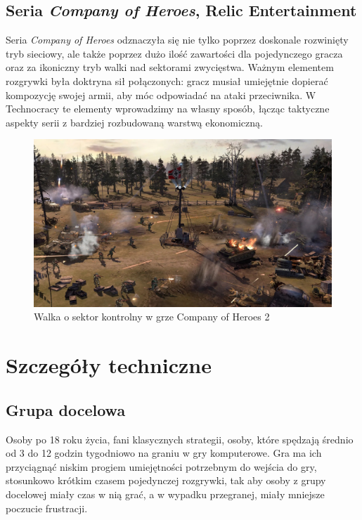 \documentclass[a4paper]{scrreprt}
\def \GameTiTle{Technocracy}
\begin{document}
\section{Seria \emph{Company of Heroes}, Relic Entertainment}
Seria \emph{Company of Heroes} odznaczyła się nie tylko poprzez doskonale rozwinięty tryb sieciowy, ale także poprzez dużo ilość zawartości dla pojedynczego gracza oraz za ikoniczny tryb walki nad sektorami zwycięstwa. Ważnym elementem rozgrywki była doktryna sił połączonych: gracz musiał umiejętnie dopierać kompozycję swojej armii, aby móc odpowiadać na ataki przeciwnika. 
W \GameTiTle{} te elementy wprowadzimy na własny sposób, łącząc taktyczne aspekty serii z bardziej rozbudowaną warstwą ekonomiczną.

\begin{figure}[hb]
    \centering
    \includegraphics[width=1\textwidth]{coh2.jpg}
    \caption{\label{} Walka o sektor kontrolny w grze Company of Heroes 2}
    \end{figure}


\chapter{Szczegóły techniczne}

\section{Grupa docelowa}
Osoby po 18 roku życia, fani klasycznych strategii, osoby, które spędzają średnio od 3 do 12 godzin tygodniowo na graniu w gry komputerowe. Gra ma ich przyciągnąć niskim progiem umiejętności potrzebnym do wejścia do gry, stosunkowo krótkim czasem pojedynczej rozgrywki, tak aby osoby z grupy docelowej miały czas w nią grać, a w wypadku przegranej, miały mniejsze poczucie frustracji.
\end{document}
